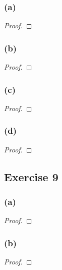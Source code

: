 \documentclass[14pt]{extarticle}
\begin{document}
\subsubsection{(a)}

\begin{proof}

\end{proof}

\subsubsection{(b)}

\begin{proof}

\end{proof}

\subsubsection{(c)}

\begin{proof}

\end{proof}

\subsubsection{(d)}

\begin{proof}

\end{proof}

\subsection{Exercise 9}

\subsubsection{(a)}

\begin{proof}

\end{proof}

\subsubsection{(b)}

\begin{proof}

\end{proof}
\end{document}
